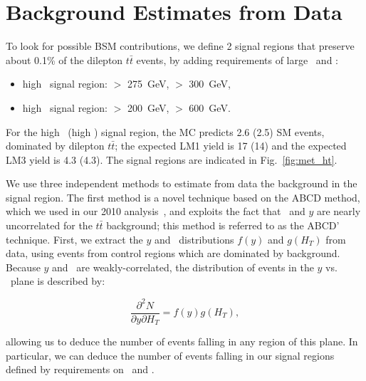 \section{Background Estimates from Data}
\label{sec:datadriven}

To look for possible BSM contributions, we define 2 signal regions that preserve about 
0.1\% of the dilepton $t\bar{t}$ events, by adding requirements of large \MET\ and \Ht:

\begin{itemize}
\item high \MET\ signal region: \MET $>$ 275~GeV, \Ht $>$ 300~GeV,
\item high \Ht\ signal region:  \MET $>$ 200~GeV, \Ht $>$ 600~GeV.
\end{itemize}

For the high \MET\ (high \Ht) signal region, the MC predicts 2.6 (2.5) SM events, 
dominated by dilepton $t\bar{t}$; the expected LM1 yield is 17 (14) and the
expected LM3 yield is 4.3 (4.3). The signal regions are indicated in Fig.~\ref{fig:met_ht}.

We use three independent methods to estimate from data the background in the signal region.
The first method is a novel technique based on the ABCD method, which we used in our 2010 analysis~\cite{ref:ospaper}, 
and exploits the fact that \HT\ and $y$ are nearly uncorrelated for the $t\bar{t}$ background;
this method is referred to as the ABCD' technique. First, we extract the $y$ and \Ht\ distributions 
$f(y)$ and $g(H_T)$ from data, using events from control regions which are dominated by background. 
Because $y$ and \Ht\ are weakly-correlated, the distribution of events in the $y$ vs. \Ht\ plane is described by:

\begin{equation}
\frac{\partial^2 N}{\partial y \partial H_T} = f(y)g(H_T),
\end{equation}

allowing us to deduce the number of events falling in any region of this plane. In particular,
we can deduce the number of events falling in our signal regions defined by requirements on \MET\ and \Ht.

